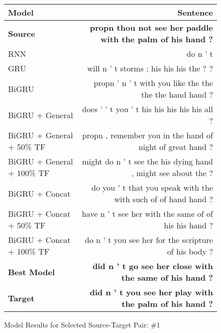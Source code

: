 \documentclass[twoside,twocolumn]{article}
\begin{document}
\begin{figure*}
    \centering
    \begin{tabular}{ |l|r| }
        \hline
        \textbf{Model}
          & \textbf{Sentence} \\
        \hline
        \textbf{Source} & \textbf{propn thou not see her paddle with the palm of his hand ?} \\ \hline
        RNN & do n ' t \\ \hline
        GRU & will n ' t storms ; his his his the ? ? \\ \hline
        BiGRU & propn ' n ' t with you like the the the the hand hand ? \\ \hline
        BiGRU + General & does ’ ’ t you ’ t his his his his his all ? \\ \hline
        BiGRU + General + 50\% TF & propn , remember you in the hand of night of great hand ? \\ \hline
        BiGRU + General + 100\% TF & might do n ’ t see the his dying hand , might see about the ? \\ \hline
        BiGRU + Concat & do you ' t that you speak with the with such of of hand hand ? \\ \hline
        BiGRU + Concat + 50\% TF & have n ' t see her with the same of of his his hand ? \\ \hline
        BiGRU + Concat + 100\% TF & do n ' t you see her for the scripture of his body ? \\ \hline
        \textbf{Best Model} & \textbf{did n ' t go see her close with the same of his hand ?} \\ \hline
        \textbf{Target} & \textbf{did n ’ t you see her play with the palm of his hand ?} \\ \hline
    \end{tabular}

    \caption{Model Results for Selected Source-Target Pair: \#1}
    \label{fig:model-results}
\end{figure*}
\end{document}
